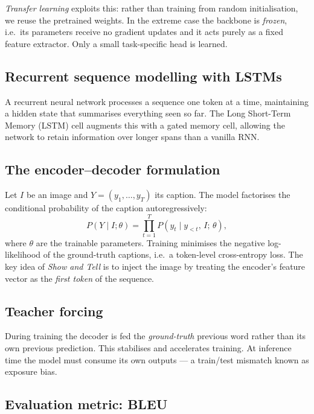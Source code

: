 \documentclass{article}
\begin{document}
\emph{Transfer learning} exploits this: rather than training from random initialisation, we reuse the pretrained weights. In the extreme case the backbone is \emph{frozen}, i.e.\ its parameters receive no gradient updates and it acts purely as a fixed feature extractor. Only a small task-specific head is learned.

\subsection{Recurrent sequence modelling with LSTMs}

A recurrent neural network processes a sequence one token at a time, maintaining a hidden state that summarises everything seen so far. The Long Short-Term Memory (LSTM) cell \citep{hochreiter1997long} augments this with a gated memory cell, allowing the network to retain information over longer spans than a vanilla RNN.

\subsection{The encoder--decoder formulation}

Let $I$ be an image and $Y = (y_1, \dots, y_T)$ its caption. The model factorises the conditional probability of the caption autoregressively:
\begin{equation}
  P(Y \mid I; \theta) = \prod_{t=1}^{T} P\!\left(y_t \mid y_{<t},\, I;\, \theta\right),
\end{equation}
where $\theta$ are the trainable parameters. Training minimises the negative log-likelihood of the ground-truth captions, i.e.\ a token-level cross-entropy loss. The key idea of \emph{Show and Tell} \citep{vinyals2015show} is to inject the image by treating the encoder's feature vector as the \emph{first token} of the sequence.

\subsection{Teacher forcing}

During training the decoder is fed the \emph{ground-truth} previous word rather than its own previous prediction. This stabilises and accelerates training. At inference time the model must consume its own outputs --- a train/test mismatch known as exposure bias.

\subsection{Evaluation metric: BLEU}
\end{document}
